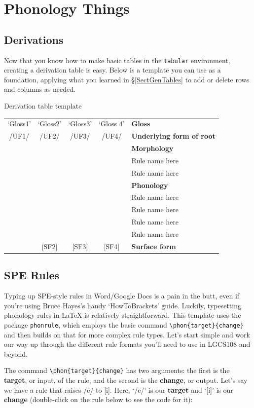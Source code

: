 \documentclass{article}
\begin{document}
\section{Phonology Things} \label{SectPhonology}

\subsection{Derivations}
Now that you know how to make basic tables in the \texttt{tabular} environment, creating a derivation table is easy. Below is a template you can use as a foundation, applying what you learned in \S\ref{SectGenTables} to add or delete rows and columns as needed.

\ea Derivation table template

\begin{tabular}[t]{|c c c c l|}
\hline
`Gloss1' & `Gloss2' & `Gloss3' & `Gloss 4' & \textbf{Gloss} \\
/UF1/ & /UF2/ & /UF3/ & /UF4/ & \textbf{Underlying form of root}\\
\hline
 & & & & \textbf{Morphology}\\
\hline
 & & & & Rule name here\\
 & & & & Rule name here\\
\hline
 & & & &\textbf{Phonology}\\
\hline
 & & & & Rule name here\\
 & & & & Rule name here\\
 & & & & Rule name here\\
 & & & & Rule name here\\
\hline
[SF1] & [SF2] & [SF3] & [SF4] & \textbf{Surface form}\\
\hline
\end{tabular}
\z

\subsection{SPE Rules}
Typing up SPE-style rules in Word/Google Docs is a pain in the butt, even if you're using Bruce Hayes's handy `HowToBrackets' guide. Luckily, typesetting phonology rules in \LaTeX{} is relatively straightforward. This template uses the package \texttt{phonrule}, which employs the basic command \verb|\phon{target}{change}| and then builds on that for more complex rule types. Let's start simple and work our way up through the different rule formats you'll need to use in LGCS108 and beyond.

The command \verb|\phon{target}{change}| has two arguments: the first is the \textbf{target}, or input, of the rule, and the second is the \textbf{change}, or output. Let's say we have a rule that raises /e/ to [i]. Here, `/e/' is our \textbf{target} and `[i]' is our \textbf{change} (double-click on the rule below to see the code for it):
\end{document}
